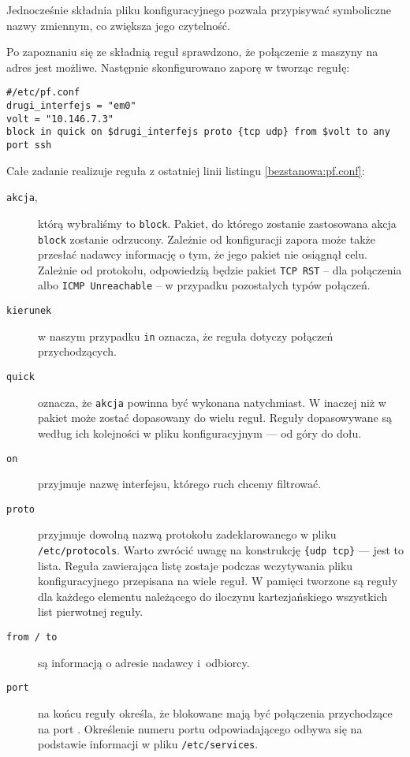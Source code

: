 Jednocześnie składnia pliku konfiguracyjnego \pf{} pozwala przypisywać
symboliczne nazwy zmiennym, co zwiększa jego czytelność.

Po zapoznaniu się ze składnią reguł sprawdzono, że połączenie \ssh{} z maszyny
\volt{} na adres \emoip{} jest możliwe. Następnie skonfigurowano zaporę \pf{} w
tworząc regułę:

\begin{lstlisting}[label=bezstanowa:pf.conf]
#/etc/pf.conf
drugi_interfejs = "em0"
volt = "10.146.7.3"
block in quick on $drugi_interfejs proto {tcp udp} from $volt to any port ssh
\end{lstlisting}

\noindent Całe zadanie realizuje reguła z ostatniej linii listingu
\ref{bezstanowa:pf.conf}:

\begin{description}

\item[\texttt{akcja}\textnormal{,}] którą wybraliśmy to \texttt{block}. Pakiet,
do którego zostanie zastosowana akcja \texttt{block} zostanie odrzucony.
Zależnie od konfiguracji zapora może także przesłać nadawcy informację o tym, że
jego pakiet nie osiągnął celu. Zależnie od protokołu, odpowiedzią będzie pakiet
\texttt{TCP RST} -- dla połączenia \tcp{} albo \texttt{ICMP Unreachable} -- w
przypadku pozostałych typów połączeń.

\item[\texttt{kierunek}] w naszym przypadku \texttt{in} oznacza, że reguła
dotyczy połączeń przychodzących.

\item[\texttt{quick}] oznacza, że \texttt{akcja} powinna być wykonana
natychmiast. W \pf{} inaczej niż w \ipfw{} pakiet może zostać dopasowany do
wielu reguł. Reguły dopasowywane są według ich kolejności w pliku
konfiguracyjnym --- od góry do dołu.

\item[\texttt{on}] przyjmuje nazwę interfejsu, którego ruch chcemy filtrować.

\item[\texttt{proto}] przyjmuje dowolną nazwą protokołu zadeklarowanego w pliku
\texttt{/etc/protocols}. Warto zwrócić uwagę na konstrukcję \texttt{\{udp tcp\}}
--- jest to lista. Reguła zawierająca listę zostaje podczas wczytywania pliku
konfiguracyjnego przepisana na wiele reguł. W pamięci tworzone są reguły dla
każdego elementu należącego do iloczynu kartezjańskiego wszystkich list
pierwotnej reguły.

\item[\texttt{from / to}] są informacją o adresie nadawcy i~odbiorcy.

\item[\texttt{port}] na końcu reguły określa, że blokowane mają być połączenia
przychodzące na port \ssh{}. Określenie numeru portu odpowiadającego \ssh{}
odbywa się na podstawie informacji w pliku \texttt{/etc/services}.

\end{description}

